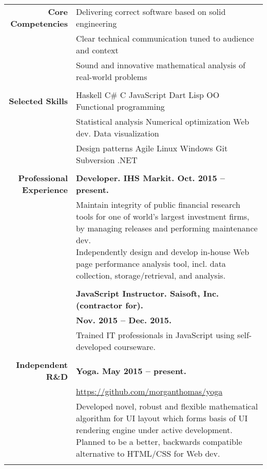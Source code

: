 \documentclass{article}
\newcommand\spc{\hspace{8pt}}
\begin{document}
\bgroup
\begin{tabular}{rl}
  \def\arraystrech{1.5}
  {\bf Core Competencies} & Delivering correct software based on solid engineering \\
   & Clear technical communication tuned to audience and context \\
   & Sound and innovative mathematical analysis of real-world problems \\ \\

  {\bf Selected Skills} & Haskell \spc C\# \spc C \spc JavaScript \spc Dart \spc Lisp \spc OO \spc Functional programming \\
  & Statistical analysis \spc Numerical optimization \spc Web dev. \spc Data visualization \\
  & Design patterns \spc Agile \spc Linux \spc Windows \spc Git \spc Subversion \spc .NET \\ \\

  {\bf Professional Experience} & {\bf Developer. IHS Markit. Oct. 2015 -- present.} \\
  & \parbox{4.5in}{Maintain integrity of public financial research tools for one of world's largest investment firms, by managing releases and performing maintenance dev. \\ Independently design and develop in-house Web page performance analysis tool, incl. data collection, storage/retrieval, and analysis.} \\ \\

  & {\bf JavaScript Instructor. Saisoft, Inc. (contractor for).} \\ & {\bf Nov. 2015 -- Dec. 2015.} \\
  & \parbox{4.5in}{Trained IT professionals in JavaScript using self-developed courseware.} \\ \\

  {\bf Independent R\&D} & {\bf Yoga. May 2015 -- present.} \\ & \href{https://github.com/morganthomas/yoga}{https://github.com/morganthomas/yoga} \\
  & \parbox{4.5in}{Developed novel, robust and flexible mathematical algorithm for UI layout which forms basis of UI rendering engine under active development. Planned to be a better, backwards compatible alternative to HTML/CSS for Web dev.} \\ \\


\end{tabular}
\end{document}
